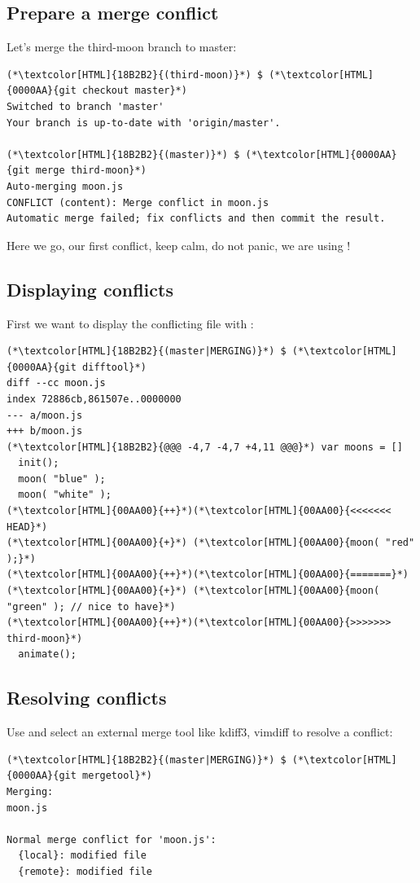 \subsection{Prepare a merge conflict}
\begin{frame}[fragile]
  \subslidetitle

  Let's merge the third-moon branch to master:
  \begin{lstlisting}
(*\textcolor[HTML]{18B2B2}{(third-moon)}*) $ (*\textcolor[HTML]{0000AA}{git checkout master}*)
Switched to branch 'master'
Your branch is up-to-date with 'origin/master'.

(*\textcolor[HTML]{18B2B2}{(master)}*) $ (*\textcolor[HTML]{0000AA}{git merge third-moon}*)
Auto-merging moon.js
CONFLICT (content): Merge conflict in moon.js
Automatic merge failed; fix conflicts and then commit the result.
\end{lstlisting}
  \vspace{1em}
  Here we go, our first conflict, keep calm, do not panic, we are using !
\end{frame}

\subsection{Displaying conflicts}
\begin{frame}[fragile]
  \subslidetitle

  First we want to display the conflicting file with :
  \begin{lstlisting}
(*\textcolor[HTML]{18B2B2}{(master|MERGING)}*) $ (*\textcolor[HTML]{0000AA}{git difftool}*)
diff --cc moon.js
index 72886cb,861507e..0000000
--- a/moon.js
+++ b/moon.js
(*\textcolor[HTML]{18B2B2}{@@@ -4,7 -4,7 +4,11 @@@}*) var moons = []
  init();
  moon( "blue" );
  moon( "white" );
(*\textcolor[HTML]{00AA00}{++}*)(*\textcolor[HTML]{00AA00}{<<<<<<< HEAD}*)
(*\textcolor[HTML]{00AA00}{+}*) (*\textcolor[HTML]{00AA00}{moon( "red" );}*)
(*\textcolor[HTML]{00AA00}{++}*)(*\textcolor[HTML]{00AA00}{=======}*)
(*\textcolor[HTML]{00AA00}{+}*) (*\textcolor[HTML]{00AA00}{moon( "green" ); // nice to have}*)
(*\textcolor[HTML]{00AA00}{++}*)(*\textcolor[HTML]{00AA00}{>>>>>>> third-moon}*)
  animate();
\end{lstlisting}
\end{frame}

\subsection{Resolving conflicts}
\begin{frame}[fragile]
  \subslidetitle
  Use  and select an external merge tool like kdiff3, vimdiff to resolve a conflict:

  \begin{lstlisting}
(*\textcolor[HTML]{18B2B2}{(master|MERGING)}*) $ (*\textcolor[HTML]{0000AA}{git mergetool}*)
Merging:
moon.js

Normal merge conflict for 'moon.js':
  {local}: modified file
  {remote}: modified file
\end{lstlisting}

\end{frame}

